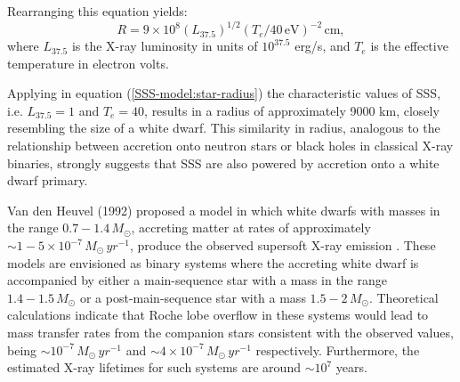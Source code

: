         	Rearranging this equation yields:
        	\begin{equation} \label{SSS-model:star-radius}
        		R=9\times 10^8(L_{37.5})^{1/2}(T_e/40\,\mathrm{eV})^{-2}\,\mathrm{cm,}
        	\end{equation}
        	where $L_{37.5}$ is the X-ray luminosity in units of $10^{37.5}$ erg/s, and $T_e$ is the effective temperature in electron volts.
        	
        	Applying in equation (\ref{SSS-model:star-radius}) the characteristic values of SSS, i.e. $L_{37.5}=1$ and $T_e=40$, results in a radius of approximately 9000 km, closely resembling the size of a white dwarf. This similarity in radius, analogous to the relationship between accretion onto neutron stars or black holes in classical X-ray binaries, strongly suggests that SSS are also powered by accretion onto a white dwarf primary.
        	
        	Van den Heuvel (1992) proposed a model in which white dwarfs with masses in the range $0.7-1.4\,M_{\odot}$, accreting matter at rates of approximately $\sim 1-5\times 10^{-7}\,M_{\odot}\,yr^{-1}$, produce the observed supersoft X-ray emission \cite{vandenHeuvel92}. These models are envisioned as binary systems where the accreting white dwarf is accompanied by either a main-sequence star with a mass in the range $1.4-1.5\,M_{\odot}$ or a post-main-sequence star with a mass $1.5-2\,M_{\odot}$. Theoretical calculations indicate that Roche lobe overflow in these systems would lead to mass transfer rates from the companion stars consistent with the observed values, being $\sim 10^{-7}\,M_{\odot}\,yr^{-1}$ and $\sim 4 \times 10^{-7}\,M_{\odot}\,yr^{-1}$ respectively. Furthermore, the estimated X-ray lifetimes for such systems are around $\sim 10^{7}$ years.
        	
